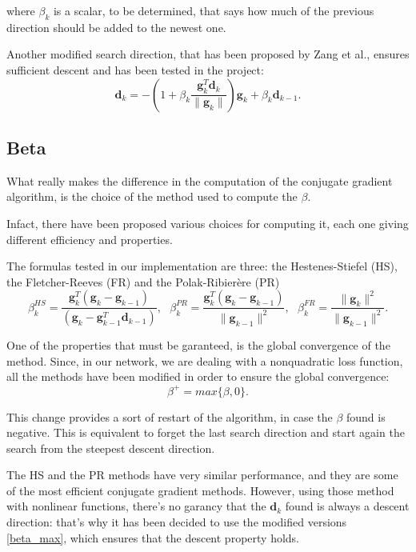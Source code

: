 			where $\beta_k$ is a scalar, to be determined, that says how much of the previous direction should be added to the newest one. 

			Another modified search direction, that has been proposed by Zang et al., ensures sufficient descent and has been tested in the project:
			\begin{equation}
			 \textbf{d}_{k} = -(1 + \beta_k\frac{\textbf{g}_k^T\textbf{d}_{k}}{\|\textbf{g}_k\|})\textbf{g}_k + \beta_k\textbf{d}_{k-1}.
			\end{equation}

		\subsection{Beta}
		\label{sub:beta}
			What really makes the difference in the computation of the conjugate gradient algorithm, is the choice of the method used to compute the $\beta$.

			Infact, there have been proposed various choices for computing it, each one giving different efficiency and properties.

			The formulas tested in our implementation are three: the Hestenes-Stiefel (HS), the Fletcher-Reeves (FR) and the Polak-Ribierère (PR)
			\begin{equation}
			\label{betas}
				 \beta^{HS}_k = \frac{\textbf{g}_k^T(\textbf{g}_k-\textbf{g}_{k-1})}{(\textbf{g}_k-\textbf{g}_{k-1}^T\textbf{d}_{k-1})}, \text{ }
				 \beta^{PR}_k = \frac{\textbf{g}_k^T(\textbf{g}_k-\textbf{g}_{k-1})}{\|\textbf{g}_{k-1}\|^2}, \text{ }
 				 \beta^{FR}_k = \frac{\|\textbf{g}_{k}\|^2}{\|\textbf{g}_{k-1}\|^2}.
			\end{equation}

			One of the properties that must be garanteed, is the global convergence of the method. Since, in our network, we are dealing with a nonquadratic loss function, all the methods have been modified in order to ensure the global convergence:
			\begin{equation}
			\label{beta_max}
				 \beta^+ = max\{\beta, 0\}.
			\end{equation}

			This change provides a sort of restart of the algorithm, in case the $\beta$ found is negative. This is equivalent to forget the last search direction and start again the search from the steepest descent direction.

			The HS and the PR methods have very similar performance, and they are some of the most efficient conjugate gradient methods. 
			However, using those method with nonlinear functions, there's no garancy that the $\textbf{d}_k$ found is always a descent direction: that's why it has been decided to use the modified versions \ref{beta_max}, which ensures that the descent property holds.

